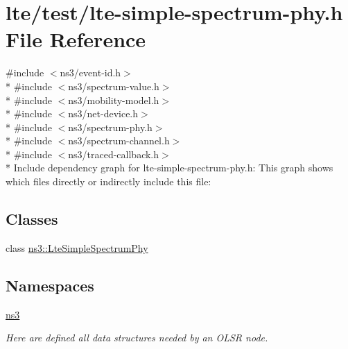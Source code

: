 \hypertarget{lte-simple-spectrum-phy_8h}{}\section{lte/test/lte-\/simple-\/spectrum-\/phy.h File Reference}
\label{lte-simple-spectrum-phy_8h}
{\ttfamily \#include $<$ns3/event-\/id.\+h$>$}\\*
{\ttfamily \#include $<$ns3/spectrum-\/value.\+h$>$}\\*
{\ttfamily \#include $<$ns3/mobility-\/model.\+h$>$}\\*
{\ttfamily \#include $<$ns3/net-\/device.\+h$>$}\\*
{\ttfamily \#include $<$ns3/spectrum-\/phy.\+h$>$}\\*
{\ttfamily \#include $<$ns3/spectrum-\/channel.\+h$>$}\\*
{\ttfamily \#include $<$ns3/traced-\/callback.\+h$>$}\\*
Include dependency graph for lte-\/simple-\/spectrum-\/phy.h\+:
This graph shows which files directly or indirectly include this file\+:
\subsection*{Classes}
\begin{DoxyCompactItemize}
\item 
class \hyperlink{classns3_1_1LteSimpleSpectrumPhy}{ns3\+::\+Lte\+Simple\+Spectrum\+Phy}
\end{DoxyCompactItemize}
\subsection*{Namespaces}
\begin{DoxyCompactItemize}
\item 
 \hyperlink{namespacens3}{ns3}
\begin{DoxyCompactList}\small\item\em Here are defined all data structures needed by an O\+L\+SR node. \end{DoxyCompactList}\end{DoxyCompactItemize}
